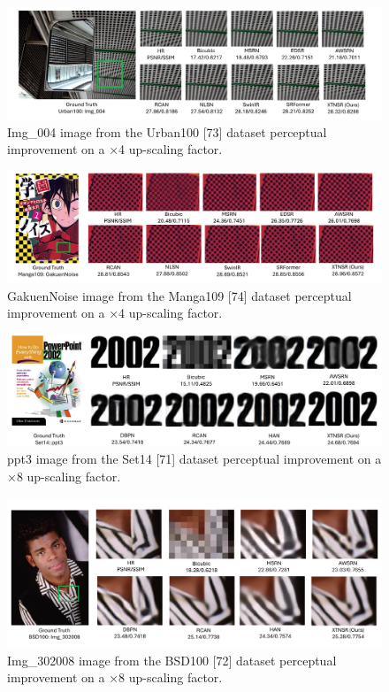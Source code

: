 \documentclass[twocolumn]{svjour3}          %
\begin{document}
\begin{figure}
  \centering
  \includegraphics[width=\linewidth]{11FIGURE.pdf}
   \caption {Img\_004 image from the Urban100 [73] dataset perceptual improvement on a ×4 up-scaling factor.}
    \label{fig:14}
\end{figure}

\begin{figure}
  \centering
  \includegraphics[width=\linewidth]{12FIGURE.pdf}
   \caption {GakuenNoise image from the Manga109 [74] dataset perceptual improvement on a ×4 up-scaling factor.}
    \label{fig:15}
\end{figure}

\begin{figure}
  \centering
  \includegraphics[width=\linewidth]{13FIGURE.pdf}
   \caption {ppt3 image from the Set14 [71] dataset perceptual improvement on a ×8  up-scaling factor.}
    \label{fig:16}
\end{figure}

\begin{figure}
  \centering
  \includegraphics[width=\linewidth]{14FIGURE.pdf}
   \caption {Img\_302008 image from the BSD100 [72] dataset perceptual improvement on a ×8 up-scaling factor.}
    \label{fig:17}
\end{figure}
\end{document}
